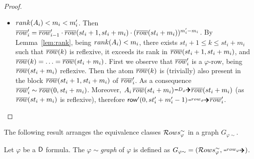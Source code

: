 \begin{proof}
\begin{itemize}
	\item $rank(A_i)<m_i<m'_i$. Then $\overline{row}'_i = \overline{row}'_{i-1} \cdot \overline{row}(st_i+1, st_i+m_i) \cdot (\overline{row}(st_i+m_i))^{m'_i-m_i}$. By Lemma~\ref{lem:rank}, being $rank(A_i)<m_i$, there exists $st_i+1\leq k\leq st_i+m_i$ such that $\overline{row}(k)$ is reflexive, it exceeds its rank in $\overline{row}(st_i+1, st_i+m_i)$, and $\overline{row}(k)=\ldots =\overline{row}(st_i+m_i)$.
	First we observe that $\overline{row}'_i$ is a $\varphi$-row, being $\overline{row}(st_i+m_i)$ reflexive. Then
	the atom $\overline{row}(k)$ is (trivially) also present in the block $\overline{row}(st_i+1, st_i+m_i)$ of $\overline{row}'_i$. As a consequence $\overline{row}'_i\sim \overline{row}(0, st_i+m_i)$. Moreover, $A_i\, \orow(st_i+m_i) \genDphi \orow(st_i+m_i)$ (as $\overline{row}(st_i+m_i)$ is reflexive), therefore $\row'(0, st_i'+m_i'-1)\rownext \orow_i'$.
	\qedhere
\end{itemize}
\end{proof}


The following result arranges the equivalence classes $\mathcal{R} ows_{\varphi}^\sim$ in a graph $G_{\varphi \sim}$.
%
\begin{definition}\label{def:equivalencegraph}
Let $\varphi$ be a $\mathsf{D}$ formula. The \emph{$\varphi\!\sim$graph} of $\varphi$ is defined as $G_{\varphi \sim}=(\Rows^\sim,\rownext)$.
\end{definition}

